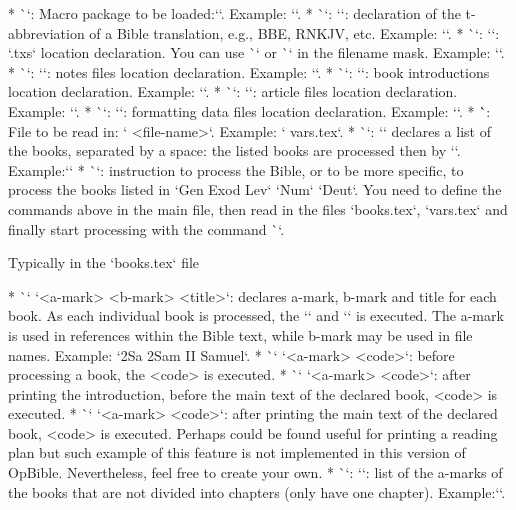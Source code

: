 {{\begitems
* \`\load`: Macro package to be loaded:``. Example: `\load [opbible]`.
* \`\tmark`: `\def\tmark{<t-abbreviation>}`: declaration of the t-abbreviation of a Bible 
translation, e.g., BBE, RNKJV, etc. 
   Example: `\def\tmark{BBE}`.
* \`\txsfile`: `\def\txsfile {<filename mask>}`: `.txs` location declaration. 
    You can use \`\amark` or \`\bmark` in the filename mask. 
    Example: `\def\txsfile {./txs/\tmark-\bmark.txs}`.
* \`\notesfile`: `\def\notesfile {<filename mask>}`:  notes files location declaration. Example: 
`\def\notesfile {./notes/notes-\amark.tex}`.
* \`\introfile`: `\def\introfile {<filename mask>}`:  book introductions location declaration. 
Example: `\def\introfile {./intros/intro-\amark.tex}`.
* \`\articlefile`: `\def\articlefile {<filename mask>}`: article files location declaration. 
   Example: `\def\articlefile {./articles/articles-\amark.tex}`.
* \`\fmtfile`: `\def\fmtfile {<filename mask>}`:  formatting data files location declaration. 
Example: `\def\fmtfile {./fmt/fmt-\tmark-\amark.tex}`.
* \``: File to be read in: ` {<file-name>}`. Example: ` {vars.tex}`.
* \`\printedbooks`: `\def\printedbooks {<list of a-marks>}` declares a list of the books, separated by a space:
    the listed books are processed then by `\processbooks`. Example:\nl `\def\printedbooks {Gen Exod Lev` 
    `Num` `Deut}`
* \`\processbooks`: instruction to process the Bible, or to be more  specific, to process the books 
listed in `\printedbooks`.
\enditems
You need to define the commands above in the main file, then
read in the files `books.tex`, `vars.tex` and finally start processing with the command
\`\processbooks`.

\secc Typically in the `books.tex` file

\begitems
* \`\BookTitle` `<a-mark> <b-mark> {<title>}`: declares  a-mark, b-mark and title for each book.
  As each individual book is processed, the  `\def\amark{<a-mark>}` and `\def\bmark{b-mark}` is 
  executed. 
  The a-mark is used in references within the Bible text, while  b-mark may be used in file names.
  Example: `\BookTitle 2Sa 2Sam {II Samuel}`.
* \`\BookException` `<a-mark> {<code>}`: before processing a book, the
  <code> is executed.
* \`\BookPre` `<a-mark> {<code>}`: after printing the introduction, before the main text of
  the declared book, <code> is executed.
* \`\BookPost` `<a-mark> {<code>}`: after printing the main text of the declared book, <code> is 
executed.
  Perhaps could be found useful for printing a reading plan but such example of this feature is not 
  implemented in this version of OpBible. 
  Nevertheless, feel free to create your own.
* \`\nochapbooks`: `\def\nochapbooks{<list>}`: list of the a-marks of the books that
  are not divided into chapters (only have one chapter). Example:\nl `\def\nochabooks {Obad Phlm 2John 3John Jude}`.
\enditems

}}

